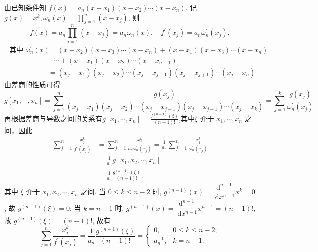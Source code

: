 \begin{tcolorbox}
 由已知条件知 $ f(x)=a_{n}\left(x-x_{1}\right)\left(x-x_{2}\right) \cdots\left(x-x_{n}\right) $.
记 $ g(x)=x^{k}, \omega_{n}(x)=\prod\limits_{j=1}^{n}\left(x-x_{j}\right) $, 则
$$
f(x)=a_n \prod\limits_{j=1}^{n}\left(x-x_{j}\right)=a_{n} \omega_{n}(x), \quad f^{\prime}\left(x_{j}\right)=a_{n} \omega_{n}^{\prime}\left(x_{j}\right),
$$
$$\begin{aligned}
\text { 其中 } \omega_{n}^{\prime}(x)&=  \left(x-x_{2}\right)\left(x-x_{3}\right) \cdots\left(x-x_{n}\right)+\left(x-x_{1}\right)\left(x-x_{3}\right) \cdots\left(x-x_{n}\right) \\
& +\cdots+\left(x-x_{1}\right)\left(x-x_{2}\right) \cdots\left(x-x_{n-1}\right)\\
&=\left(x_{j}-x_{1}\right)\left(x_{j}-x_{2}\right) \cdots\left(x_{j}-x_{j-1}\right)\left(x_{j}-x_{j+1}\right) \cdots\left(x_{j}-x_{n}\right) 
\end{aligned} $$
由差商的性质可得 $$ g\left[x_{1}, \cdots, x_{n}\right]=\sum\limits_{j=1}^{n}\frac{g(x_j)}{\left(x_{j}-x_{1}\right)\left(x_{j}-x_{2}\right) \cdots\left(x_{j}-x_{j-1}\right)\left(x_{j}-x_{j+1}\right) \cdots\left(x_{j}-x_{k}\right) }=\sum\limits_{j=1}^{k} \frac{g\left(x_{j}\right)}{\omega_{n}^{\prime}\left(x_{j}\right)}  $$
再根据差商与导数之间的关系有$ g\left[x_{1}, \cdots, x_{n}\right]=\frac{f^{(n-1)}(\xi)}{(n-1) !}$,其中$ \xi $ 介于 $ x_{1}, \cdots, x_{n} $ 之间，因此
$$
\begin{aligned}
\sum_{j=1}^{n} \frac{x_{j}^{k}}{f^{\prime}\left(x_{j}\right)} & =\sum_{j=1}^{n} \frac{x_{j}^{k}}{a_{n} \omega_{n}^{\prime}\left(x_{j}\right)}=\frac{1}{a_{n}} \sum_{j=1}^{n} \frac{x_{j}^{k}}{\omega_{n}^{\prime}\left(x_{j}\right)} \\
& =\frac{1}{a_{n}} g\left[x_{1}, x_{2}, \cdots, x_{n}\right] \\
& =\frac{1}{a_{n}} \frac{g^{(n-1)}(\xi)}{(n-1) !},
\end{aligned}
$$
其中 $ \xi $ 介于 $ x_{1}, x_{2}, \cdots, x_{n} $ 之间.
当 $ 0 \leqslant k \leqslant n-2 $ 时, $ g^{(n-1)}(x)=\dfrac{\mathrm{d}^{n-1}}{\mathrm{~d} x^{n-1}} x^{k}=0 $, 故 $ g^{(n-1)}(\xi)=0 $;
当 $ k=n-1 $ 时, $ g^{(n-1)}(x)=\dfrac{\mathrm{d}^{n-1}}{\mathrm{~d} x^{n-1}} x^{n-1}=(n-1) ! $, 故 $ g^{(n-1)}(\xi)=(n-1) ! $, 故有
$$
\sum_{j=1}^{n} \frac{x_{j}^{k}}{f^{\prime}\left(x_{j}\right)}=\frac{1}{a_{n}} \frac{g^{(n-1)}(\xi)}{(n-1) !}=\left\{\begin{array}{ll}
0, & 0 \leqslant k \leqslant n-2 ; \\
a_{n}^{-1}, & k=n-1 .
\end{array}\right.
$$

\end{tcolorbox}

